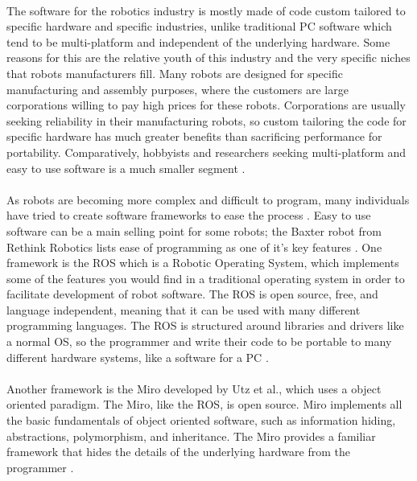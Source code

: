 \documentclass[titlepage,letterpaper,12pt]{article}
\begin{document}
\paragraph{}The software for the robotics industry is mostly made of code custom
tailored to specific hardware and specific industries, unlike traditional PC
software which tend to be multi-platform and independent of the underlying hardware.
Some reasons for this are the relative youth of this industry and the very
specific niches that robots manufacturers fill. Many robots are designed for
specific manufacturing and assembly purposes, where the customers are large
corporations willing to pay high prices for these robots. Corporations are
usually seeking reliability in their manufacturing robots, so custom tailoring
the code for specific hardware has much greater benefits than sacrificing
performance for portability. Comparatively, hobbyists and researchers seeking
multi-platform and easy to use software is a much smaller segment
\cite{jang2010opros}.

\paragraph{}As robots are becoming more complex and difficult to program, many
individuals have tried to create software frameworks to ease the process
\cite{quigley2009ros}. Easy to use software can be a main selling point for some
robots; the Baxter robot from Rethink Robotics lists ease of programming as one
of it's key features \cite{baxterdata}. One framework is the ROS which is a
Robotic Operating System, which implements some of the features you would find
in a traditional operating system in order to facilitate development of robot
software. The ROS is open source, free, and language independent, meaning that
it can be used with many different programming languages. The ROS is structured
around libraries and drivers like a normal OS, so the programmer and write their
code to be portable to many different hardware systems, like a software for a PC
\cite{quigley2009ros}.

\paragraph{}Another framework is the Miro developed by Utz et al., which
uses a object oriented paradigm. The Miro, like the ROS, is
open source. Miro implements all the basic fundamentals of object oriented
software, such as information hiding, abstractions, polymorphism, and
inheritance. The Miro provides a familiar framework that hides the details of
the underlying hardware from the programmer \cite{utz2002miro}.
\end{document}
